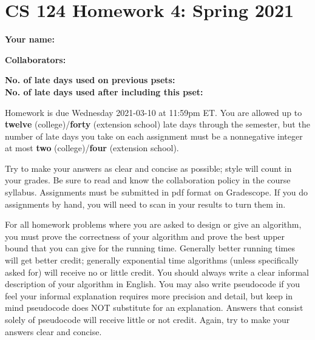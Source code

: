 \documentclass[10pt]{article}
\begin{document}
	
	\section*{CS 124 Homework 4: Spring 2021}
 		
	\textbf{Your name:} 
		
	\textbf{Collaborators:} 

	\textbf{No. of late days used on previous psets: }\\
	\textbf{No. of late days used after including this pset: }

Homework is due Wednesday 2021-03-10 at 11:59pm ET. You are allowed up to {\bf twelve} (college)/{\bf forty} (extension school) late days through the semester, but the number of late days you take on each assignment must be a nonnegative integer at most {\bf two} (college)/{\bf four} (extension school).

Try to make your answers as clear and concise as possible;
style will count in your grades. Be sure to read and know the collaboration policy in the course
syllabus. Assignments must be submitted in pdf format on Gradescope. If you do assignments by hand, you
will need to scan in your results to turn them in. 

For all homework problems where you are asked to design or give an algorithm, you must prove the correctness
of your algorithm and prove the best upper bound that you can give for the running time. Generally
better running times will get better credit; generally exponential time algorithms (unless specifically asked
for) will receive no or little credit. You should always write a clear informal description of your algorithm
in English. You may also write pseudocode if you feel your informal explanation requires more precision
and detail, but keep in mind pseudocode does NOT substitute for an explanation. Answers that consist
solely of pseudocode will receive little or not credit. Again, try to make your answers clear and concise.
\end{document}
